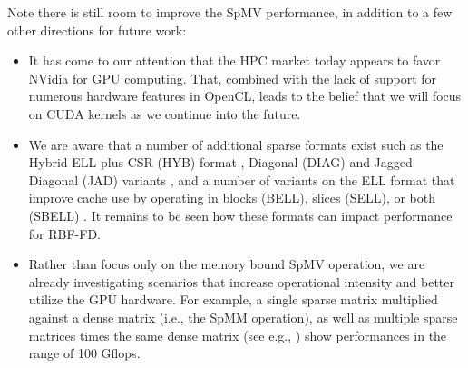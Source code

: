 \documentclass{report}
\begin{document}
Note there is still room to improve the SpMV performance, in addition to a few other directions for future work:
\begin{itemize} 
\item 
It has come to our attention that the HPC market today appears to favor NVidia for GPU computing. %
That, combined with the lack of support for numerous hardware features in OpenCL, leads to the belief that we will focus on CUDA kernels as we continue into the future. 

\item We are aware that a number of additional sparse formats exist such as the Hybrid ELL plus CSR (HYB) format \cite{Bell2009}, Diagonal (DIAG) and Jagged Diagonal (JAD) variants \cite{LiSaad2010}, and a number of variants on the ELL format that improve cache use by operating in blocks (BELL), slices (SELL), or both (SBELL) \cite{SuKeutzer2012}. It remains to be seen how these formats can impact performance for RBF-FD. 

\item Rather than focus only on the memory bound SpMV operation, we are already investigating scenarios that increase operational intensity and better utilize the GPU hardware. For example, a single sparse matrix multiplied against a dense matrix (i.e., the SpMM operation), as well as multiple sparse matrices times the same dense matrix (see e.g., \cite{ErlebacherSauleFlyerBollig2013}) show performances in the range of 100 Gflops. 
\end{itemize}



\ifstandalone


\end{document}
